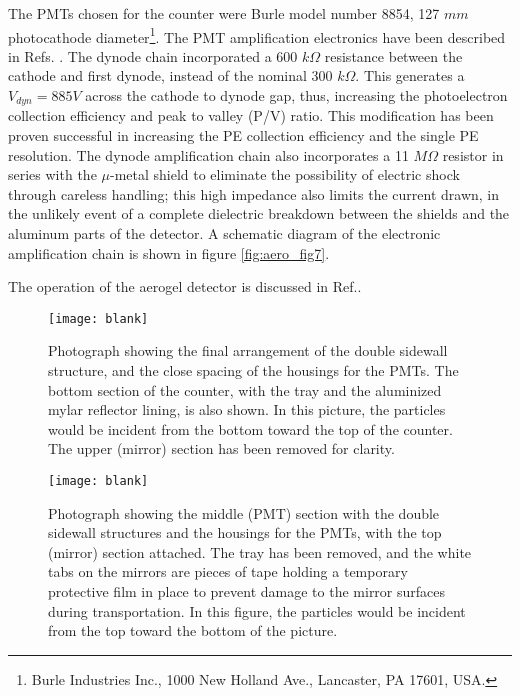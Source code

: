 The PMTs chosen for the counter were Burle model number 8854, 127 $mm$
photocathode 
diameter\footnote{Burle Industries Inc., 1000 New Holland Ave., Lancaster, PA 17601, USA.}.
  The PMT amplification electronics have
been described in Refs. \cite{Alexa:1995ne,Lolos:1997vz}.  The dynode chain incorporated a
600 $k\Omega$ resistance between the cathode and first dynode, instead of the
nominal 300 $k\Omega$.  This generates a $V_{dyn}=885 V$ across the cathode to
dynode gap, thus, increasing the photoelectron collection efficiency and peak
to valley (P/V) ratio.  This modification has been proven successful in
increasing the PE collection efficiency and the single PE resolution.  The
dynode amplification chain also incorporates a 11 $M\Omega$ resistor in series
with the $\mu$-metal shield to eliminate the possibility of electric shock
through careless handling; this high impedance also limits the current drawn,
in the unlikely event of a complete dielectric breakdown between the shields
and the aluminum parts of the detector. A schematic diagram of the electronic 
amplification chain is shown in figure \ref{fig:aero_fig7}. 

The operation of the aerogel detector is discussed in Ref.\cite{Brash:2002vn}.

\begin{figure}[p]
\texttt{[image: blank]}
\caption{
 Photograph showing the final arrangement of the double sidewall
 structure, and the close spacing of the housings for the PMTs.  The bottom
 section of the counter, with the tray and the aluminized mylar reflector
 lining, is also shown.  In this picture, the particles would be incident from
 the bottom toward the top of the counter.  The upper (mirror) section has been
 removed for clarity.
 }
\label{fig:aero_fig3}
\end{figure}

\begin{figure}[p]
\texttt{[image: blank]}
\caption{
 Photograph showing the middle (PMT) section with the double sidewall
 structures and the housings for the PMTs, with the top (mirror) section
 attached.  The tray has been removed, and the white tabs on the mirrors are
 pieces of tape holding a temporary protective film in place to prevent damage
 to the mirror surfaces during transportation.  In this figure, the particles
 would be incident from the top toward the bottom of the picture.
 }
\label{fig:aero_fig4}
\end{figure}

